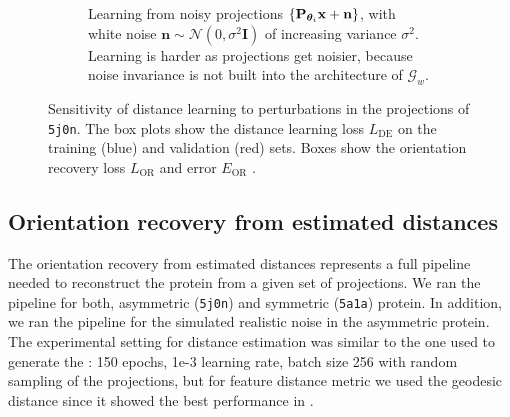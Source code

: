 \begin{figure}[ht!]
\begin{subfigure}[t]{0.47\linewidth}
        \caption{%
            Learning from noisy projections $\{ \mathbf{P}_{{\boldsymbol{\theta}}_i} \mathbf{x} + \mathbf{n} \}$, with white noise $\mathbf{n} \sim \mathcal{N}(0, \sigma^2\mathbf{I})$ of increasing variance $\sigma^2$.
            Learning is harder as projections get noisier, because noise invariance is not built into the architecture of $\mathcal{G}_w$.
        }\label{fig:results:distance-estimation:noise}
    \end{subfigure}
    \caption{%
        Sensitivity of distance learning to perturbations in the projections of \texttt{5j0n}.
        The box plots show the distance learning loss $L_\text{DE}$  on the training (blue) and validation (red) sets.
        Boxes show the orientation recovery loss $L_\text{OR}$  and error $E_\text{OR}$ .
    }
\end{figure}


\subsection{Orientation recovery from estimated distances}



The orientation recovery from estimated distances represents a full pipeline needed to reconstruct the protein from a given set of projections.
We ran the pipeline for both, asymmetric (\texttt{5j0n}) and symmetric (\texttt{5a1a}) protein.
In addition, we ran the pipeline for the simulated realistic noise in the asymmetric protein.
The experimental setting for distance estimation was similar to the one used to generate the : 150 epochs, 1e-3 learning rate, batch size 256 with random sampling of the projections, but for feature distance metric we used the geodesic distance since it showed the best performance in .

